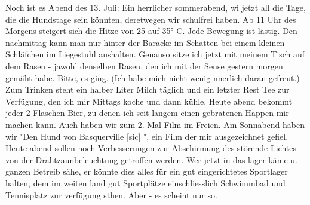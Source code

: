 \def\day{{\color{red} [neue Seite ohne Seitenangabe, 13.7.42] }}
\mktitle

Noch ist es Abend des 13. Juli: Ein herrlicher sommerabend, wi jetzt all die Tage, die die Hundstage sein k\"{o}nnten, deretwegen wir schulfrei haben.
Ab 11 Uhr des Morgens steigert sich die Hitze von 25 auf 35° C.
Jede Bewegung ist l\"{a}stig.
Den nachmittag kann man nur hinter der Baracke im Schatten bei einem kleinen Schl\"{a}fchen im Liegestuhl aushalten.
Genauso sitze ich jetzt mit meinem Tisch auf dem Rasen - jawohl denselben Rasen, den ich mit der Sense gestern morgen gem\"{a}ht habe.
Bitte, es ging.
(Ich habe mich nicht wenig nnerlich daran gefreut.)
Zum Trinken steht ein halber Liter Milch t\"{a}glich und ein letzter Rest Tee zur Verf\"{u}gung, den ich mir Mittags koche und dann k\"{u}hle.
Heute abend bekommt jeder 2 Flaschen Bier, zu denen ich seit langem einen gebratenen Happen mir machen kann.
Auch haben wir zum 2. Mal Film im Freien.
Am Sonnabend haben wir "Den Hund von Basquerville{\color{red} [sic] }", ein Film der mir ausgezeichnet gefiel.
Heute abend sollen noch Verbesserungen zur Abschirmung des st\"{o}rende Lichtes von der Drahtzaunbeleuchtung getroffen werden.
Wer jetzt in das lager k\"{a}me u. ganzen Betreib s\"{a}he, er k\"{o}nnte dies alles f\"{u}r ein gut eingerichtetes Sportlager halten, dem im weiten land gut Sportpl\"{a}tze einschliesslich Schwimmbad und Tennisplatz zur verf\"{u}gung sthen.
Aber - es scheint nur so.

\clearpage
